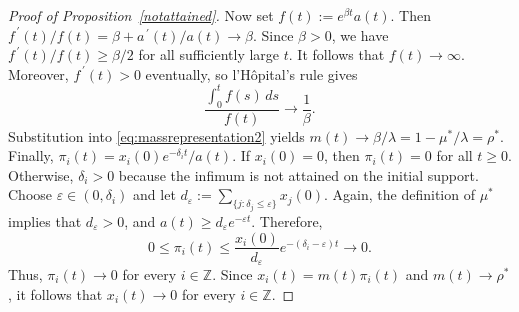\documentclass[10pt,a4paper]{amsart}
\newcommand{\Z}{\ensuremath{\mathbb Z}}
\newcommand{\myprime}{\,\prime}
\begin{document}
\begin{proof}[Proof of Proposition~\ref{notattained}]
Now set $f(t):=e^{\beta t}a(t)$. Then
$f^{\myprime}(t)/f(t)=\beta+a^{\myprime}(t)/a(t)\to\beta$. Since $\beta>0$, we have
$f^{\myprime}(t)/f(t)\geq\beta/2$ for all sufficiently large $t$. It follows
that $f(t)\to\infty$. Moreover, $f^{\myprime}(t)>0$ eventually, so
l'H{\^o}pital's rule gives
$$
\frac{\int_0^t f(s)\,ds}{f(t)} \to \frac{1}{\beta}.
$$
Substitution into \eqref{eq:massrepresentation2} yields
$m(t)\to {\beta}/{\lambda} = 1-{\mu^*}/{\lambda} = \rho^*$.
Finally,
$\pi_i(t)=x_i(0)e^{-\delta_i t}/a(t)$. If $x_i(0)=0$, then
$\pi_i(t)=0$ for all $t\geq0$. Otherwise, $\delta_i>0$ because the
infimum is not attained on the initial support. Choose
$\varepsilon\in(0,\delta_i)$ and let
$d_\varepsilon:=\sum_{\{j:\delta_j\leq\varepsilon\}}x_j(0)$.
Again, the definition of $\mu^*$ implies that $d_\varepsilon>0$, and
$a(t)\geq d_\varepsilon e^{-\varepsilon t}$. Therefore,
$$
0\leq\pi_i(t)
\leq
\frac{x_i(0)}{d_\varepsilon}
e^{-(\delta_i-\varepsilon)t}
\to 0.
$$
Thus, $\pi_i(t)\to 0$ for every $i\in\Z$. Since
$x_i(t)=m(t)\pi_i(t)$ and $m(t)\to\rho^*$, it follows that
$x_i(t)\to 0$ for every $i\in\Z$.
\end{proof}
\end{document}
